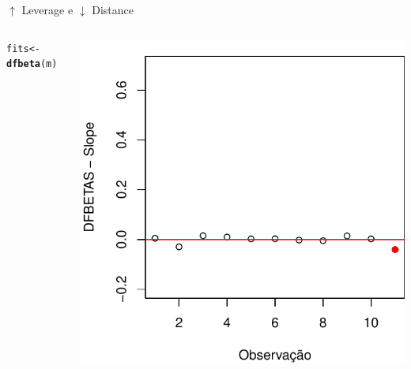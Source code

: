 \documentclass{beamer}\usepackage[]{graphicx}\usepackage[]{color}
\makeatletter
\newcommand{\hlstd}[1]{\textcolor[rgb]{0.345,0.345,0.345}{#1}}%
\newcommand{\hlkwb}[1]{\textcolor[rgb]{0.69,0.353,0.396}{#1}}%
\newcommand{\hlkwd}[1]{\textcolor[rgb]{0.737,0.353,0.396}{\textbf{#1}}}%
\newenvironment{kframe}{%
 \def\at@end@of@kframe{}%
 \ifinner\ifhmode%
  \def\at@end@of@kframe{\end{minipage}}%
  \begin{minipage}{\columnwidth}%
 \fi\fi%
 \def\FrameCommand##1{\hskip\@totalleftmargin \hskip-\fboxsep
 \colorbox{shadecolor}{##1}\hskip-\fboxsep
     \hskip-\linewidth \hskip-\@totalleftmargin \hskip\columnwidth}%
 \MakeFramed {\advance\hsize-\width
   \@totalleftmargin\z@ \linewidth\hsize
   \@setminipage}}%
 {\par\unskip\endMakeFramed%
 \at@end@of@kframe}
\newenvironment{knitrout}{}{} %
\renewenvironment{knitrout}{\setlength{\topsep}{0mm}}{}
\makeatother
\begin{document}
\begin{frame}{$\uparrow$ Leverage e $\downarrow$ Distance}
\begin{columns}[c]
\begin{knitrout}\tiny
{}\color{fgcolor}\begin{kframe}
\begin{alltt}
\hlstd{fits} \hlkwb{<-} \hlkwd{dfbeta}\hlstd{(m)}
\end{alltt}
\end{kframe}
\includegraphics[width=1\linewidth]{figure/inf16-1} 

\end{knitrout}

\end{columns}
\end{frame}
\end{document}
